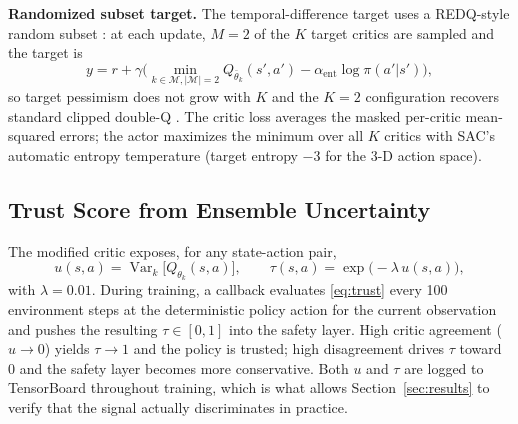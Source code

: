 \documentclass[conference]{IEEEtran}
\begin{document}
\textbf{Randomized subset target.} The temporal-difference target uses a REDQ-style random subset \cite{chen2021redq}: at each update, $M{=}2$ of the $K$ target critics are sampled and the target is
\begin{equation}
y = r + \gamma \Big( \min_{k \in \mathcal{M}, |\mathcal{M}|=2} Q_{\bar\theta_k}(s', a') - \alpha_{\mathrm{ent}} \log \pi(a'|s') \Big),
\end{equation}
so target pessimism does not grow with $K$ and the $K{=}2$ configuration recovers standard clipped double-Q \cite{fujimoto2018td3}. The critic loss averages the masked per-critic mean-squared errors; the actor maximizes the minimum over all $K$ critics with SAC's automatic entropy temperature (target entropy $-3$ for the 3-D action space).

\subsection{Trust Score from Ensemble Uncertainty}
The modified critic exposes, for any state-action pair,
\begin{equation}
u(s,a) = \operatorname{Var}_{k}\!\big[Q_{\theta_k}(s,a)\big], \qquad
\tau(s,a) = \exp\!\big(-\lambda\, u(s,a)\big),
\label{eq:trust}
\end{equation}
with $\lambda = 0.01$. During training, a callback evaluates \eqref{eq:trust} every 100 environment steps at the deterministic policy action for the current observation and pushes the resulting $\tau \in [0,1]$ into the safety layer. High critic agreement ($u \to 0$) yields $\tau \to 1$ and the policy is trusted; high disagreement drives $\tau$ toward 0 and the safety layer becomes more conservative. Both $u$ and $\tau$ are logged to TensorBoard throughout training, which is what allows Section~\ref{sec:results} to verify that the signal actually discriminates in practice.
\end{document}
